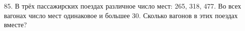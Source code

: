 85. В трёх пассажирских поездах различное число мест: 265, 318, 477. Во всех вагонах число мест одинаковое и большее 30. Сколько вагонов в этих поездах вместе?\\
